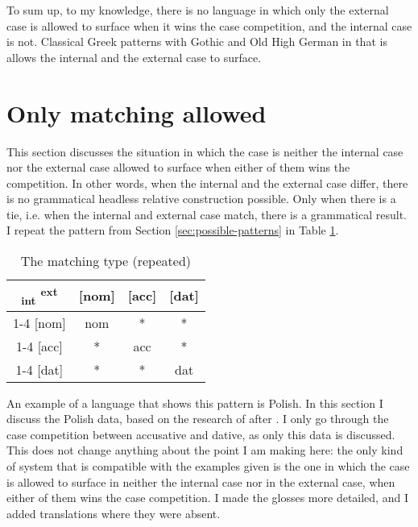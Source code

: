 To sum up, to my knowledge, there is no language in which only the external case is allowed to surface when it wins the case competition, and the internal case is not. Classical Greek patterns with Gothic and Old High German in that is allows the internal and the external case to surface.



\section{Only matching allowed}\label{sec:pattern-iv}

This section discusses the situation in which the case is neither the internal case nor the external case allowed to surface when either of them wins the competition. In other words, when the internal and the external case differ, there is no grammatical headless relative construction possible. Only when there is a tie, i.e. when the internal and external case match, there is a grammatical result. I repeat the pattern from Section \ref{sec:possible-patterns} in Table \ref{tbl:case-competition-none-repeated}.

\begin{table}[ht]
  \center
  \caption{The matching type (repeated)}
  \begin{tabular}{c|c|c|c}
    \toprule
    \textsubscript{\ac{int}} \textsuperscript{\ac{ext}}
           & [\ac{nom}]
           & [\ac{acc}]
           & [\ac{dat}]
           \\ \cmidrule{1-4}
       [\ac{nom}]
           & \ac{nom}
           & *
           & *
           \\ \cmidrule{1-4}
       [\ac{acc}]
           & *
           & \ac{acc}
           & *
           \\ \cmidrule{1-4}
       [\ac{dat}]
           & *
           & *
           & \ac{dat}
           \\
     \bottomrule
  \end{tabular}
    \label{tbl:case-competition-none-repeated}
\end{table}

An example of a language that shows this pattern is Polish. In this section I discuss the Polish data, based on the research of \citet{citko2013} after \citet{himmelreich2017}. I only go through the case competition between accusative and dative, as only this data is discussed. This does not change anything about the point I am making here: the only kind of system that is compatible with the examples given is the one in which the case is allowed to surface in neither the internal case nor in the external case, when either of them wins the case competition. I made the glosses more detailed, and I added translations where they were absent.


